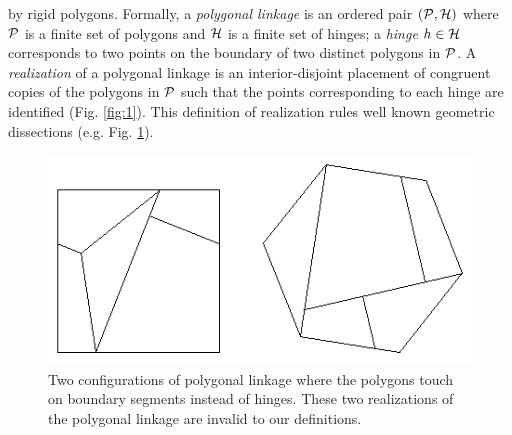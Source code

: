 by rigid polygons.  Formally, a \textit{polygonal linkage} is an ordered pair $\left({\cal P},{\cal H} 
\right)$ where ${\cal P}$ is a finite set of polygons and ${\cal H}$ is a finite set of hinges; a 
\textit{hinge} $h\in {\cal H}$ 
corresponds to two points on the boundary of two distinct polygons in ${\cal P}$.  A \emph{realization} 
of a polygonal linkage is an interior-disjoint placement of 
congruent copies of the polygons in ${\cal P}$ such that the points corresponding to each hinge are 
identified (Fig. \ref{fig:1}). This definition of realization rules well known geometric 
dissections (e.g. Fig. \ref{fig:polygonallinkage-4}).
\begin{figure}[h]
\begin{center}
\includegraphics[scale=.25]{graphics/polygonaldissection.png}
\end{center}
\caption{Two configurations of polygonal linkage where the polygons touch on boundary segments 
instead of hinges.  These two realizations of the polygonal linkage are invalid to our definitions. 
 }
\label{fig:polygonallinkage-4}
\end{figure}


